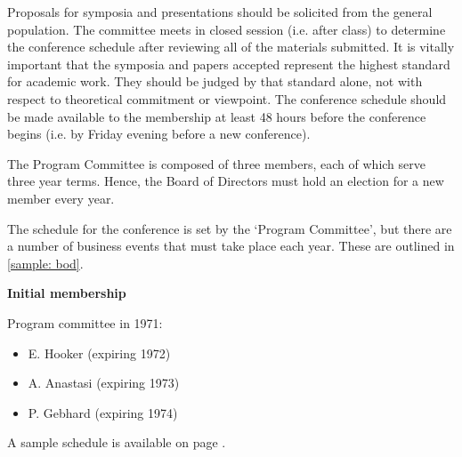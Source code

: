 Proposals for symposia and presentations should be solicited from the general population. The committee meets in closed session (i.e. after class) to determine the conference schedule after reviewing all of the materials submitted. It is vitally important that the symposia and papers accepted represent the highest standard for academic work. They should be judged by that standard alone, not with respect to theoretical commitment or viewpoint. The conference schedule should be made available to the membership at least 48 hours before the conference begins (i.e. by Friday evening before a new conference).

The Program Committee is composed of three members, each of which serve three year terms. Hence, the Board of Directors must hold an election for a new member every year.

The schedule for the conference is set by the `Program Committee', but there are a number of business events that must take place each year. These are outlined in \ref{sample: bod}.

\textbf{Initial membership}

Program committee in 1971:

\begin{itemize}
\item E. Hooker (expiring 1972)

\item A. Anastasi (expiring 1973)

\item P. Gebhard (expiring 1974)

\end{itemize}

A sample schedule is available on page \pageref{sample:bod}.


